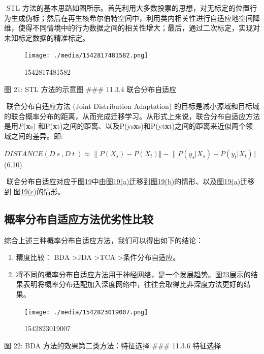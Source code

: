 ​ STL
方法的基本思路如图所示。首先利用大多数投票的思想，对无标定的位置行为生成伪标；然后在再生核希尔伯特空间中，利用类内相关性进行自适应地空间降维，使得不同情境中的行为数据之间的相关性增大；最后，通过二次标定，实现对未知标定数据的精准标定。

\begin{figure}
\centering
\texttt{[image: ./media/1542817481582.png]}
\caption{1542817481582}
\end{figure}

图 21: STL 方法的示意图 \#\#\# 11.3.4 联合分布自适应

​ 联合分布自适应方法 (Joint Distribution Adaptation)
的目标是减小源域和目标域的联合概率分布的距离，从而完成迁移学习。从形式上来说，联合分布自适应方法是用\emph{P}(\textbf{x}s)
和P(\textbf{x}t)之间的距离、以及P(ys\textbar{}\textbf{x}s)和P(yt\textbar{}\textbf{x}t)之间的距离来近似两个领域之间的差异。即:

​
\(DISTANCE(D~s~,D~t~)\approx\lVert P(X_s)-P(X_t)\Vert-\lVert P(y_s|X_s)-P(y_t|X_t)\Vert​\)(6.10)

​
联合分布自适应对应于图\protect\hyperlink{bookmark84}{19}中由图\protect\hyperlink{bookmark101}{19(a)}迁移到图\protect\hyperlink{bookmark83}{19(b)}的情形、以及图\protect\hyperlink{bookmark101}{19(a)}迁移到
图\protect\hyperlink{bookmark85}{19(c)}的情形。

\subsection{概率分布自适应方法优劣性比较}\label{ux6982ux7387ux5206ux5e03ux81eaux9002ux5e94ux65b9ux6cd5ux4f18ux52a3ux6027ux6bd4ux8f83}

综合上述三种概率分布自适应方法，我们可以得出如下的结论：

\begin{enumerate}
\def\labelenumi{\arabic{enumi}.}
\tightlist
\item
  精度比较： BDA \textgreater{}JDA \textgreater{}TCA
  \textgreater{}条件分布自适应。
\item
  将不同的概率分布自适应方法用于神经网络，是一个发展趋势。图\protect\hyperlink{bookmark119}{23}展示的结果表明将概率分布适配加入深度网络中，往往会取得比非深度方法更好的结果。
\end{enumerate}

\begin{figure}
\centering
\texttt{[image: ./media/1542823019007.png]}
\caption{1542823019007}
\end{figure}

图 22: BDA 方法的效果第二类方法：特征选择 \#\#\# 11.3.6 特征选择


